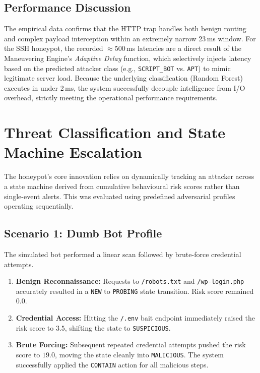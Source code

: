 \subsection{Performance Discussion}
The empirical data confirms that the \ac{HTTP} trap handles both benign routing and complex payload interception within an extremely narrow 23\,ms window. For the \ac{SSH} honeypot, the recorded $\approx 500$\,ms latencies are a direct result of the Maneuvering Engine's \textit{Adaptive Delay} function, which selectively injects latency based on the predicted attacker class (e.g., \texttt{SCRIPT\_BOT} vs. \texttt{APT}) to mimic legitimate server load. Because the underlying classification (Random Forest) executes in under 2\,ms, the system successfully decouple intelligence from I/O overhead, strictly meeting the operational performance requirements.

\section{Threat Classification and State Machine Escalation}

The honeypot's core innovation relies on dynamically tracking an attacker across a state machine derived from cumulative behavioural risk scores rather than single-event alerts. This was evaluated using predefined adversarial profiles operating sequentially.

\subsection{Scenario 1: Dumb Bot Profile}
The simulated bot performed a linear scan followed by brute-force credential attempts.
\begin{enumerate}
    \item \textbf{Benign Reconnaissance:} Requests to \texttt{/robots.txt} and \texttt{/wp-login.php} accurately resulted in a \texttt{NEW} to \texttt{PROBING} state transition. Risk score remained $0.0$.
    \item \textbf{Credential Access:} Hitting the \texttt{/.env} bait endpoint immediately raised the risk score to $3.5$, shifting the state to \texttt{SUSPICIOUS}.
    \item \textbf{Brute Forcing:} Subsequent repeated credential attempts pushed the risk score to $19.0$, moving the state cleanly into \texttt{MALICIOUS}. The system successfully applied the \texttt{CONTAIN} action for all malicious steps.
\end{enumerate}

